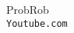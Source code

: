 \documentclass[12pt]{report}                                %
\begin{document}
\clearpage

    \begin{thebibliography}{9}

        ProbRob
        \\\texttt{Youtube.com}


     

\end{thebibliography}
\end{document}
